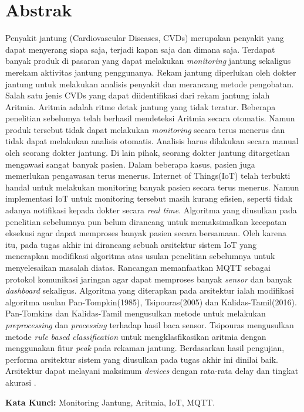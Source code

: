 \chapter*{Abstrak}
Penyakit jantung (Cardiovascular Diseases, CVDs) merupakan penyakit yang dapat menyerang siapa saja, terjadi kapan saja dan dimana saja. Terdapat banyak produk di pasaran yang dapat melakukan \textit{monitoring} jantung sekaligus merekam aktivitas jantung penggunanya. Rekam jantung diperlukan oleh dokter jantung untuk melakukan analisis penyakit dan merancang metode pengobatan. Salah satu jenis CVDs yang dapat diidentifikasi dari rekam jantung ialah Aritmia. Aritmia adalah ritme detak jantung yang tidak teratur. Beberapa penelitian sebelumya telah berhasil mendeteksi Aritmia secara otomatis.	
Namun produk tersebut tidak dapat melakukan \textit{monitoring} secara terus menerus dan tidak dapat melakukan analisis otomatis. Analisis harus dilakukan secara manual oleh seorang dokter jantung. Di lain pihak, seorang dokter jantung ditargetkan mengawasi sangat banyak pasien. Dalam beberapa kasus, pasien juga memerlukan pengawasan terus menerus. Internet of Things(IoT) telah terbukti handal untuk melakukan monitoring banyak pasien secara terus menerus. Namun implementasi IoT untuk monitoring tersebut masih kurang efisien, seperti tidak adanya notifikasi kepada dokter secara \textit{real time}. Algoritma yang diusulkan pada penelitian sebelumnya pun belum dirancang untuk memaksimalkan kecepatan eksekusi agar dapat memproses banyak pasien secara bersamaan.
Oleh karena itu, pada tugas akhir ini dirancang sebuah arsitektur sistem IoT yang menerapkan modifikasi algoritma atas usulan penelitian sebelumnya untuk menyelesaikan masalah diatas.
Rancangan memanfaatkan MQTT sebagai protokol komunikasi jaringan agar dapat memproses banyak \textit{sensor} dan banyak \textit{dashboard} sekaligus. Algoritma yang diterapkan pada arsitektur ialah modifikasi algoritma usulan Pan-Tompkin(1985), Tsipouras(2005) dan Kalidas-Tamil(2016). Pan-Tomkins dan Kalidas-Tamil mengusulkan metode untuk melakukan \textit{preprocessing} dan \textit{processing} terhadap hasil baca sensor. Tsipouras mengusulkan metode \textit{rule based classification} untuk mengklasfikasikan aritmia dengan menggunakan fitur \textit{peak} pada rekaman jantung.
Berdasarkan hasil pengujian, performa arsitektur sistem yang diusulkan pada tugas akhir ini dinilai baik. Arsitektur dapat melayani maksimum \sensor \textit{devices} dengan rata-rata delay \delay dan tingkat akurasi \accuracy.
  
\vspace{0.5 cm}
\begin{flushleft}
{\textbf{Kata Kunci:} Monitoring Jantung, Aritmia, IoT, MQTT.}
\end{flushleft}